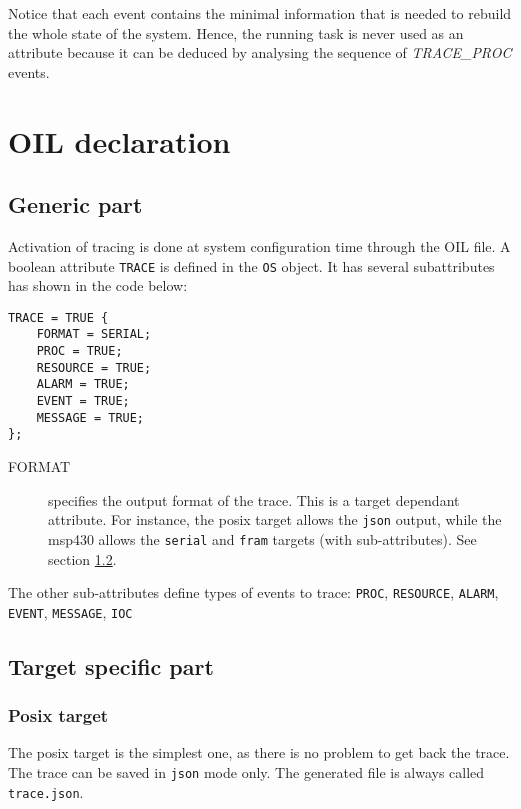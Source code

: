 Notice that each event contains the minimal information that is needed
to rebuild the whole state of the system.
Hence, the running task is never used as an attribute because it can be deduced
by analysing the sequence of \emph{TRACE\_PROC} events.

\section{OIL declaration}
\subsection{Generic part}

Activation of tracing is done at system configuration time through the OIL file.
A boolean attribute \texttt{TRACE} is defined in the \texttt{OS} object. It has
several subattributes has shown in the code below:

\begin{lstlisting}[language=OIL]
TRACE = TRUE {
    FORMAT = SERIAL;
    PROC = TRUE;
    RESOURCE = TRUE;
    ALARM = TRUE;
    EVENT = TRUE;
    MESSAGE = TRUE;
};
\end{lstlisting}

\begin{description}
	\item[FORMAT] specifies the output format of the trace. This is a target dependant attribute. For instance, the posix target allows the \texttt{json} output, while the msp430 allows the \texttt{serial} and \texttt{fram} targets (with sub-attributes). See section \ref{sec:traceTargetFormat}.

\end{description}
The other sub-attributes define types of events to trace: \texttt{PROC}, \texttt{RESOURCE}, \texttt{ALARM}, \texttt{EVENT}, \texttt{MESSAGE}, \texttt{IOC}

\subsection{Target specific part}
\label{sec:traceTargetFormat}
\subsubsection{Posix target}
The posix target is the simplest one, as there is no problem to get back the trace. The trace can be saved in \texttt{json} mode only. The generated file is always called \texttt{trace.json}.

